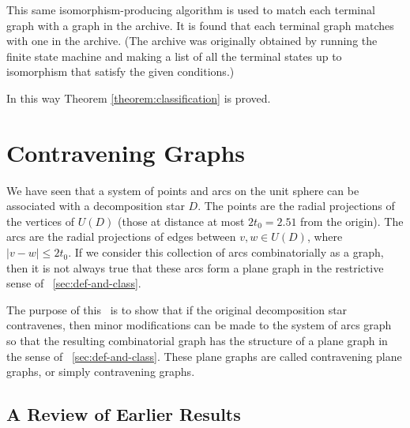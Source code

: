 This same isomorphism-producing algorithm is used to match each
terminal graph with a graph in the archive.  It is found that each
terminal graph matches with one in the archive. (The archive was
originally obtained by running the finite state machine and making
a list of all the terminal states up to isomorphism that satisfy
the given conditions.)

In this way Theorem \ref{theorem:classification} is proved.

\chapter{Contravening Graphs}
    \label{sec:startame}

We have seen that a system of points and arcs on the unit sphere
can be associated with a decomposition star $D$.  The points are
the radial projections of the vertices of $U(D)$ (those at
distance at most $2t_0=2.51$ from the origin).  The arcs are the
radial projections of edges between $v,w\in U(D)$, where
$|v-w|\le2t_0$.  If we consider this collection of arcs
combinatorially as a graph, then it is not always true that these
arcs form a plane graph in the restrictive sense of
\Chap~\ref{sec:def-and-class}.

The purpose of this \chap\ is to show that if the original
decomposition star contravenes, then minor modifications can be
made to the system of arcs graph so that the resulting
combinatorial graph has the structure of a plane graph in the
sense of \Chap~\ref{sec:def-and-class}. These plane graphs are
called contravening plane graphs, or simply contravening graphs.


\section{A Review of Earlier Results}
    \label{sec:star-review}


